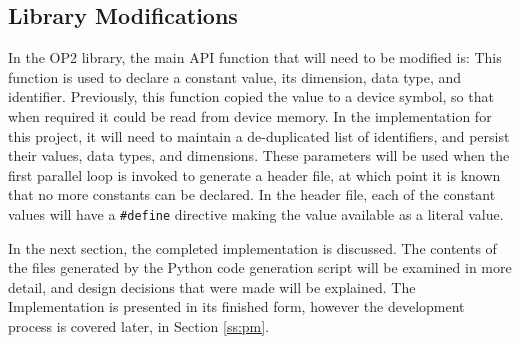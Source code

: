 \subsection{Library Modifications}
In the OP2 library, the main API function that will need to be modified is:
\noindent This function is used to declare a constant value, its dimension, data type, and identifier.
Previously, this function copied the value to a device symbol, so that when required it could be read from device memory. In the implementation for this project, it will need to maintain a de-duplicated list of identifiers, and persist their values, data types, and dimensions. These parameters will be used when the first parallel loop is invoked to generate a header file, at which point it is known that no more constants can be declared. In the header file, each of the constant values will have a \verb|#define| directive making the value available as a literal value.\par
In the next section, the completed implementation is discussed. The contents of the files generated by the Python code generation script will be examined in more detail, and design decisions that were made will be explained. The Implementation is presented in its finished form, however the development process is covered later, in Section \ref{ss:pm}.
